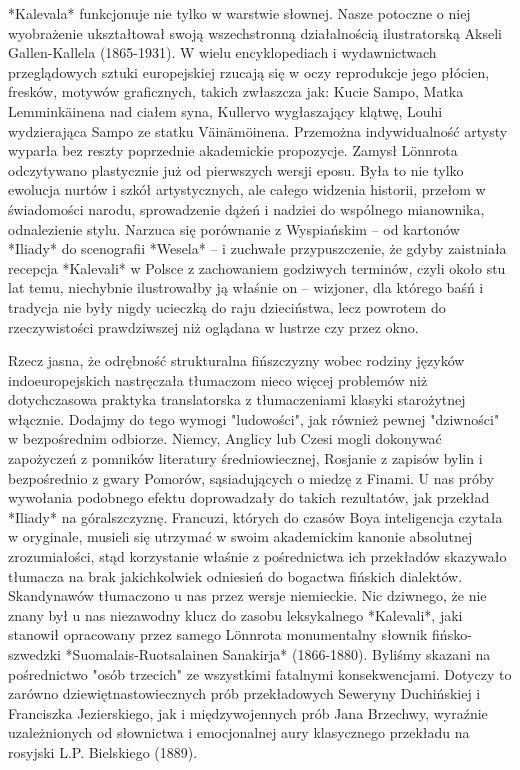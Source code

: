 *Kalevala* funkcjonuje nie tylko w warstwie słownej. Nasze potoczne o niej wyobrażenie ukształtował swoją wszechstronną działalnością ilustratorską Akseli Gallen-Kallela (1865-1931). W wielu encyklopediach i wydawnictwach przeglądowych sztuki europejskiej rzucają się w oczy reprodukcje jego płócien, fresków, motywów graficznych, takich zwłaszcza jak: Kucie Sampo, Matka Lemminkäinena nad ciałem syna, Kullervo wygłaszający klątwę, Louhi wydzierająca Sampo ze statku Väinämöinena. Przemożna indywidualność artysty wyparła bez reszty poprzednie akademickie propozycje. Zamysł Lönnrota odczytywano plastycznie już od pierwszych wersji eposu. Była to nie tylko ewolucja nurtów i szkół artystycznych, ale całego widzenia historii, przełom w świadomości narodu, sprowadzenie dążeń i nadziei do wspólnego mianownika, odnalezienie stylu. Narzuca się porównanie z Wyspiańskim -- od kartonów *Iliady* do scenografii *Wesela* -- i zuchwałe przypuszczenie, że gdyby zaistniała recepcja *Kalevali* w Polsce z zachowaniem godziwych terminów, czyli około stu lat temu, niechybnie ilustrowałby ją właśnie on -- wizjoner, dla którego baśń i tradycja nie były nigdy ucieczką do raju dzieciństwa, lecz powrotem do rzeczywistości prawdziwszej niż oglądana w lustrze czy przez okno.

Rzecz jasna, że odrębność strukturalna fińszczyzny wobec rodziny języków indoeuropejskich nastręczała tłumaczom nieco więcej problemów niż dotychczasowa praktyka translatorska z tłumaczeniami klasyki starożytnej włącznie. Dodajmy do tego wymogi "ludowości", jak również pewnej "dziwności" w bezpośrednim odbiorze. Niemcy, Anglicy lub Czesi mogli dokonywać zapożyczeń z pomników literatury średniowiecznej, Rosjanie z zapisów bylin i bezpośrednio z gwary Pomorów, sąsiadujących o miedzę z Finami. U nas próby wywołania podobnego efektu doprowadzały do takich rezultatów, jak przekład *Iliady* na góralszczyznę. Francuzi, których do czasów Boya inteligencja czytała w oryginale, musieli się utrzymać w swoim akademickim kanonie absolutnej zrozumiałości, stąd korzystanie właśnie z pośrednictwa ich przekładów skazywało tłumacza na brak jakichkolwiek odniesień do bogactwa fińskich dialektów. Skandynawów tłumaczono u nas przez wersje niemieckie. Nic dziwnego, że nie znany był u nas niezawodny klucz do zasobu leksykalnego *Kalevali*, jaki stanowił opracowany przez samego Lönnrota monumentalny słownik fińsko-szwedzki *Suomalais-Ruotsalainen Sanakirja* (1866-1880). Byliśmy skazani na pośrednictwo "osób trzecich" ze wszystkimi fatalnymi konsekwencjami. Dotyczy to zarówno dziewiętnastowiecznych prób przekładowych Seweryny Duchińskiej i Franciszka Jezierskiego, jak i międzywojennych prób Jana Brzechwy, wyraźnie uzależnionych od słownictwa i emocjonalnej aury klasycznego przekładu na rosyjski L.P. Bielskiego (1889).

